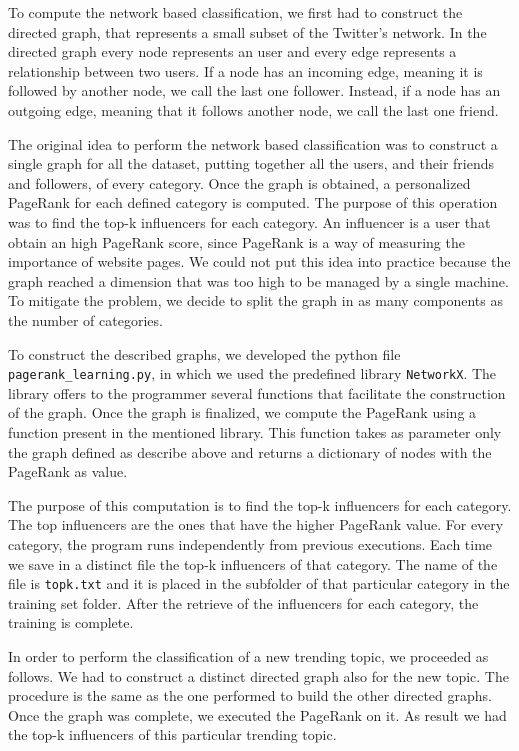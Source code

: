 \documentclass[journal,11pt]{vgtc}
\begin{document}
To compute the network based classification, we first had to construct the directed graph, that represents a small
subset of the Twitter's network.
In the directed graph every node represents an user and every edge represents a relationship between two users.
If a node has an incoming edge, meaning it is followed by another node, we call the last one follower. Instead, if a node has an
outgoing edge, meaning that it follows another node, we call the last one friend.

The original idea to perform the network based classification was to construct a single graph for all the dataset, putting 
together all the users, and their friends and followers, of every category.
Once the graph is obtained, a personalized PageRank for each defined category is computed. 
The purpose of this operation was to find the top-k influencers for each category. 
An influencer is a user that obtain an high PageRank score, since PageRank is a way of measuring the importance of website pages.
We could not put this idea into practice because the graph reached a dimension that was too high 
to be managed by a single machine. 
To mitigate the problem, we decide to split the graph in as many components as the number of categories.

To construct the described graphs, we developed the python file \texttt{pagerank\_learning.py}, 
in which we used the predefined library \texttt{NetworkX}. 
The library offers to the programmer several functions that facilitate the construction of the graph.
Once the graph is finalized, we compute the PageRank using a function present in the mentioned library.
This function takes as parameter only the graph defined as describe above and returns a dictionary of nodes
with the PageRank as value.

The purpose of this computation is to find the top-k influencers for each category. The top influencers
are the ones that have the higher PageRank value.
For every category, the program runs independently from previous executions. Each time we save in a
distinct file the top-k influencers of that category. The name of the file is
\texttt{topk.txt} and it is placed in the subfolder of that particular category in the training set folder.
After the retrieve of the influencers for each category, the training is complete.

In order to perform the classification of a new trending topic, we proceeded as follows.
We had to construct a distinct directed graph also for the new topic. The procedure is the same as the one performed
to build the other directed graphs. Once the graph was complete, we executed the PageRank on it.
As result we had the top-k influencers of this particular trending topic.
\end{document}
